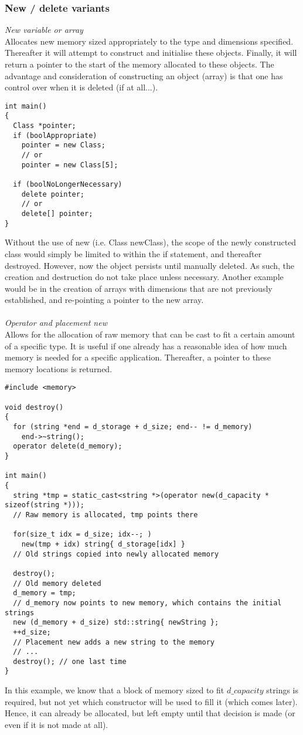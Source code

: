\subsubsection*{New / delete variants}

\textit{New variable or array} \\
Allocates new memory sized appropriately to the type and dimensions specified. Thereafter it will attempt to construct and initialise these objects. Finally, it will return a pointer to the start of the memory allocated to these objects. The advantage and consideration of constructing an object (array) is that one has control over when it is deleted (if at all...).

\begin{lstlisting}[style=inline]
int main()
{
  Class *pointer;
  if (boolAppropriate)
    pointer = new Class;
    // or
    pointer = new Class[5];

  if (boolNoLongerNecessary)
    delete pointer;
    // or
    delete[] pointer;
}
\end{lstlisting}

Without the use of new (i.e. Class newClass), the scope of the newly constructed class would simply be limited to within the if statement, and thereafter destroyed. However, now the object persists until manually deleted. As such, the creation and destruction do not take place unless necessary. Another example would be in the creation of arrays with dimensions that are not previously established, and re-pointing a pointer to the new array. \\
\\
\textit{Operator and placement new} \\
Allows for the allocation of raw memory that can be cast to fit a certain amount of a specific type. It is useful if one already has a reasonable idea of how much memory is needed for a specific application. Thereafter, a pointer to these memory locations is returned.

\begin{lstlisting}[style=inline]
#include <memory>

void destroy()
{
  for (string *end = d_storage + d_size; end-- != d_memory)
    end->~string();
  operator delete(d_memory);
}

int main()
{
  string *tmp = static_cast<string *>(operator new(d_capacity * sizeof(string *)));
  // Raw memory is allocated, tmp points there

  for(size_t idx = d_size; idx--; )
    new(tmp + idx) string{ d_storage[idx] }
  // Old strings copied into newly allocated memory

  destroy();
  // Old memory deleted
  d_memory = tmp;
  // d_memory now points to new memory, which contains the initial strings
  new (d_memory + d_size) std::string{ newString };
  ++d_size;
  // Placement new adds a new string to the memory
  // ...
  destroy(); // one last time
}
\end{lstlisting}

In this example, we know that a block of memory sized to fit $d\_capacity$ strings is required, but not yet which constructor will be used to fill it (which comes later). Hence, it can already be allocated, but left empty until that decision is made (or even if it is not made at all).

